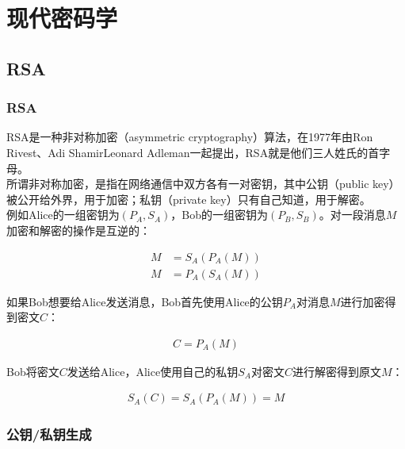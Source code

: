 \chapter{现代密码学}

\section{RSA}

\subsection{RSA}

RSA是一种非对称加密（asymmetric cryptography）算法，在1977年由Ron Rivest、Adi ShamirLeonard Adleman一起提出，RSA就是他们三人姓氏的首字母。\\

所谓非对称加密，是指在网络通信中双方各有一对密钥，其中公钥（public key）被公开给外界，用于加密；私钥（private key）只有自己知道，用于解密。\\

例如Alice的一组密钥为$ (P_A, S_A) $，Bob的一组密钥为$ (P_B, S_B) $。对一段消息$ M $加密和解密的操作是互逆的：

\vspace{-1cm}

\begin{align*}
    M & = S_A(P_A(M)) \\
    M & = P_A(S_A(M))
\end{align*}

如果Bob想要给Alice发送消息，Bob首先使用Alice的公钥$ P_A $对消息$ M $进行加密得到密文$ C $：

\vspace{-1cm}

\begin{align*}
    C = P_A(M)
\end{align*}

Bob将密文$ C $发送给Alice，Alice使用自己的私钥$ S_A $对密文$ C $进行解密得到原文$ M $：

\vspace{-1cm}

\begin{align*}
    S_A(C) = S_A(P_A(M)) = M
\end{align*}

\vspace{0.5cm}

\subsection{公钥/私钥生成}

